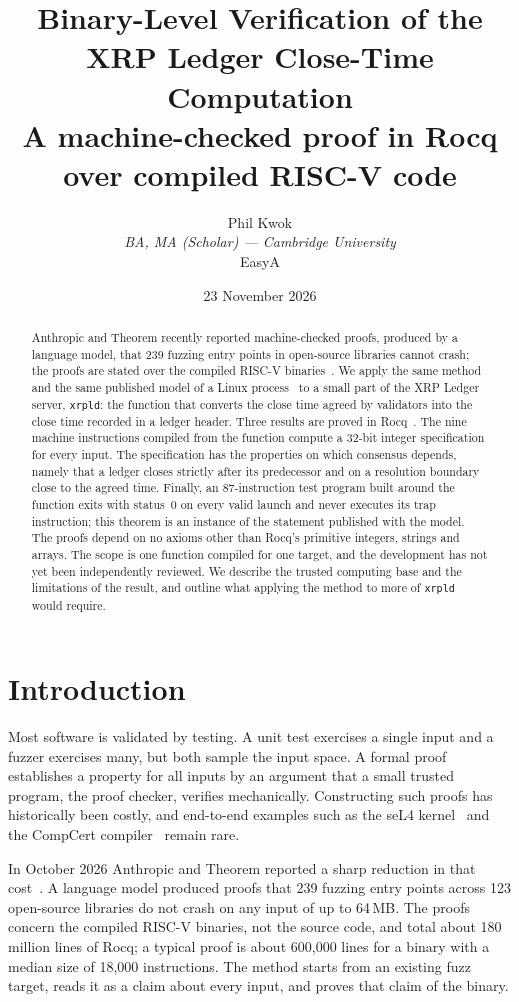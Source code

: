 \documentclass[11pt,a4paper]{article}
\title{\textbf{Binary-Level Verification of the\\
XRP Ledger Close-Time Computation}\\[8pt]
\large A machine-checked proof in Rocq over compiled RISC-V code}
\author{Phil Kwok\\[4pt]
\normalsize\textit{BA, MA (Scholar) --- Cambridge University}\\[2pt]
\normalsize EasyA}
\date{23 November 2026}
\theoremstyle{definition}
\begin{document}
\maketitle

\begin{abstract}
\noindent Anthropic and Theorem recently reported machine-checked proofs,
produced by a language model, that 239 fuzzing entry points in open-source
libraries cannot crash; the proofs are stated over the compiled RISC-V
binaries~\cite{anthropic}. We apply the same method and the same published
model of a Linux process~\cite{lps} to a small part of the XRP Ledger server,
\texttt{xrpld}: the function that converts the close time agreed by
validators into the close time recorded in a ledger header. Three results
are proved in Rocq~\cite{rocq}. The nine machine instructions compiled from
the function compute a 32-bit integer specification for every input. The
specification has the properties on which consensus depends, namely that a
ledger closes strictly after its predecessor and on a resolution boundary
close to the agreed time. Finally, an 87-instruction test program built
around the function exits with status~0 on every valid launch and never
executes its trap instruction; this theorem is an instance of the statement
published with the model. The proofs depend on no axioms other than Rocq's
primitive integers, strings and arrays. The scope is one function compiled
for one target, and the development has not yet been independently reviewed.
We describe the trusted computing base and the limitations of the result,
and outline what applying the method to more of \texttt{xrpld} would
require.
\end{abstract}

\section{Introduction}

Most software is validated by testing. A unit test exercises a single input
and a fuzzer exercises many, but both sample the input space. A formal proof
establishes a property for all inputs by an argument that a small trusted
program, the proof checker, verifies mechanically. Constructing such proofs
has historically been costly, and end-to-end examples such as the seL4
kernel~\cite{sel4} and the CompCert compiler~\cite{compcert} remain rare.

In October 2026 Anthropic and Theorem reported a sharp reduction in that
cost~\cite{anthropic}. A language model produced proofs that 239 fuzzing
entry points across 123 open-source libraries do not crash on any input of
up to 64\,MB. The proofs concern the compiled RISC-V binaries, not the
source code, and total about 180 million lines of Rocq; a typical proof is
about 600,000 lines for a binary with a median size of 18,000 instructions.
The method starts from an existing fuzz target, reads it as a claim about
every input, and proves that claim of the binary.
\end{document}
